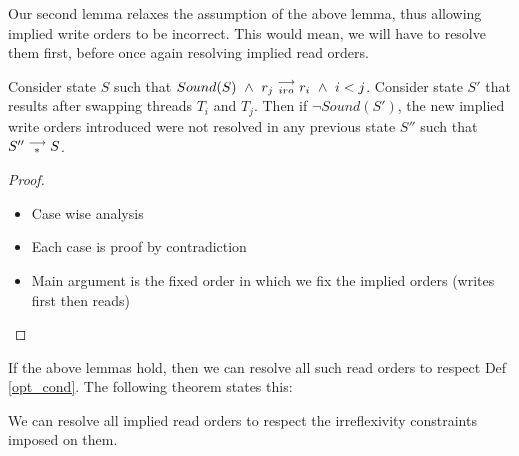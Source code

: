         Our second lemma relaxes the assumption of the above lemma, thus allowing implied write orders to be incorrect. 
        This would mean, we will have to resolve them first, before once again resolving implied read orders.
        \begin{lemma}
            \label{iwo-unres-iro}
            Consider state $S$ such that $Sound(S) \ \wedge \ \reln{r_j}{iro}{r_i} \ \wedge \ i < j$.
            Consider state $S'$ that results after swapping threads $T_i$ and $T_j$. 
            Then if $\neg Sound(S')$, the new implied write orders introduced were not resolved in any previous state $S''$ such that $S''\stackrel{\longrightarrow}{_{*}}S$. 
        
        \end{lemma}


        \begin{proof}
            \begin{itemize}
                \item Case wise analysis
                \item Each case is proof by contradiction
                \item Main argument is the fixed order in which we fix the implied orders (writes first then reads)
            \end{itemize}    
        \end{proof}

        If the above lemmas hold, then we can resolve all such read orders to respect Def \ref{opt_cond}.
        The following theorem states this:
        \begin{theorem}
            \label{fwdprog-iro}
            We can resolve all implied read orders to respect the irreflexivity constraints imposed on them.
        \end{theorem}

